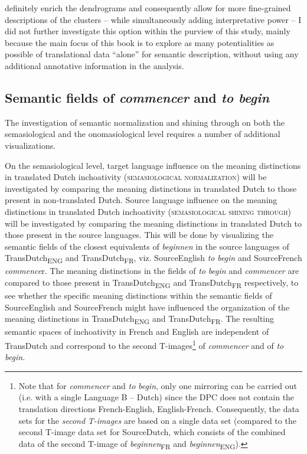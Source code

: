 definitely enrich the dendrograms and consequently allow for more fine-grained descriptions of the clusters – while simultaneously adding interpretative power – I did not further investigate this option within the purview of this study, mainly because the main focus of this book is to explore as many potentialities as possible of translational data ``alone'' for semantic description, without using any additional annotative information in the analysis.

\subsection{Semantic fields of \textit{commencer} and \textit{to begin}}
\label{sec:3.8.2}  
The investigation of semantic normalization and shining through on both the semasiological and the onomasiological level requires a number of additional visualizations.

On the semasiological level, target language influence on the meaning distinctions in translated Dutch inchoativity (\textsc{semasiological normalization}) will be investigated by comparing the meaning distinctions in translated Dutch to those present in non-translated Dutch. Source language influence on the meaning distinctions in translated Dutch inchoativity (\textsc{semasiological shining through}) will be investigated by comparing the meaning distinctions in translated Dutch to those present in the source languages. This will be done by visualizing the semantic fields of the closest equivalents of \textit{beginnen} in the source languages of TransDutch\textsubscript{ENG} and TransDutch\textsubscript{FR}, viz. SourceEnglish \textit{to} \textit{begin} and SourceFrench \textit{commence}r. The meaning distinctions in the fields of \textit{to} \textit{begin} and \textit{commencer} are compared to those present in TransDutch\textsubscript{ENG} and TransDutch\textsubscript{FR} respectively, to see whether the specific meaning distinctions within the semantic fields of SourceEnglish and SourceFrench might have influenced the organization of the meaning distinctions in TransDutch\textsubscript{ENG} and TransDutch\textsubscript{FR}. The resulting semantic spaces of inchoativity in French and English are independent of TransDutch and correspond to the second T-images\footnote{Note that for \textit{commencer} and \textit{to} \textit{begin}, only one mirroring can be carried out (i.e. with a single Language B – Dutch) since the DPC does not contain the translation directions French-English, English-French. Consequently, the data sets for the \textit{second} \textit{T-images} are based on a single data set (compared to the second T-image data set for SourceDutch, which consists of the combined data of the second T-image of \textit{beginnen}\textsubscript{FR} and \textit{beginnen}\textsubscript{ENG}).} of \textit{commencer} and of \textit{to} \textit{begin.}

